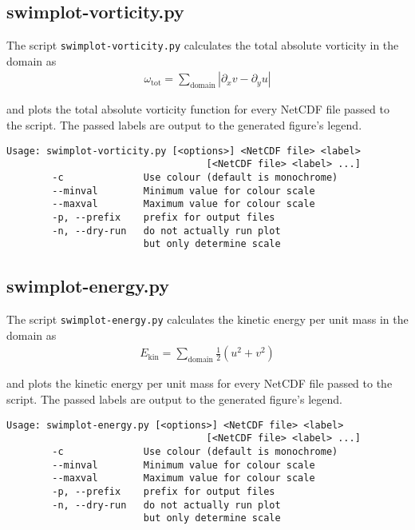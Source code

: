 \documentclass[11pt,a4paper,openright,twoside]{book}
\begin{document}
\subsection{swimplot-vorticity.py}
The script \texttt{swimplot-vorticity.py} calculates the total absolute vorticity in the domain as
\begin{eqnarray}
  \omega_\mathrm{tot} = \sum_\mathrm{domain} |\partial_x v - \partial_y u|
\end{eqnarray}

and plots the total absolute vorticity function for every NetCDF file passed to the script. The
passed labels are output to the generated figure's legend.

\begin{verbatim}
Usage: swimplot-vorticity.py [<options>] <NetCDF file> <label>
                                   [<NetCDF file> <label> ...]
        -c              Use colour (default is monochrome)
        --minval        Minimum value for colour scale
        --maxval        Maximum value for colour scale
        -p, --prefix    prefix for output files
        -n, --dry-run   do not actually run plot
                        but only determine scale
\end{verbatim}

\subsection{swimplot-energy.py}
The script \texttt{swimplot-energy.py} calculates the kinetic energy per unit mass in the domain as
\begin{eqnarray}
  E_\mathrm{kin} = \sum_\mathrm{domain} \frac{1}{2}\left(u^2+v^2\right)
\end{eqnarray}

and plots the kinetic energy per unit mass for every NetCDF file passed to the script. The
passed labels are output to the generated figure's legend.

\begin{verbatim}
Usage: swimplot-energy.py [<options>] <NetCDF file> <label>
                                   [<NetCDF file> <label> ...]
        -c              Use colour (default is monochrome)
        --minval        Minimum value for colour scale
        --maxval        Maximum value for colour scale
        -p, --prefix    prefix for output files
        -n, --dry-run   do not actually run plot
                        but only determine scale
\end{verbatim}
\end{document}
